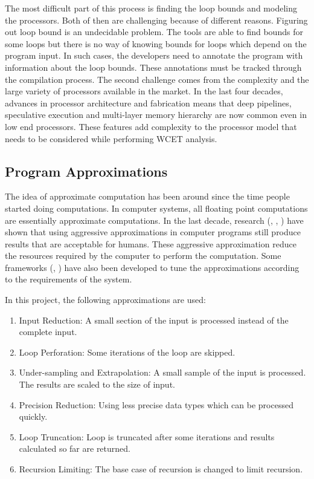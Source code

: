 The most difficult part of this process is finding the loop bounds and  modeling the processors. Both of then are challenging because of different reasons. Figuring out loop bound is an undecidable problem. The tools are able to find bounds for some loops but there is no way of knowing bounds for loops which depend on the program input. In such cases, the developers need to annotate the program with information about the loop bounds. These annotations must be tracked through the compilation process. The second challenge comes from the complexity and the large variety of processors available in the market. In the last four decades, advances in processor architecture and fabrication means that deep pipelines, speculative execution and multi-layer memory hierarchy are now common even in low end processors. These features add complexity to the processor model that needs to be considered while performing WCET analysis. 


\subsection{Program Approximations}
The idea of approximate computation has been around since the time people started doing computations. In computer systems, all floating point computations are essentially approximate computations. In the last decade, research (\cite{Loop}, \cite{Image}, \cite{Canary}) have shown that using aggressive approximations in computer programs still produce results that are acceptable for humans. These aggressive approximation reduce the resources required by the computer to perform the computation. Some frameworks (\cite{Green}, \cite{Knobs}) have also been developed to tune the approximations according to the requirements of the system.

In this project, the following approximations are used: 
\begin{enumerate}
\item Input Reduction: A small section of the input is processed instead of the complete input.
\item Loop Perforation: Some iterations of the loop are skipped.
\item Under-sampling and Extrapolation: A small sample of the input is processed. The results are scaled to the size of input.
\item Precision Reduction: Using less precise data types which can be processed quickly.
\item Loop Truncation: Loop is truncated after some iterations and results calculated so far are returned.
\item Recursion Limiting: The base case of recursion is changed to limit recursion.
\end{enumerate}


